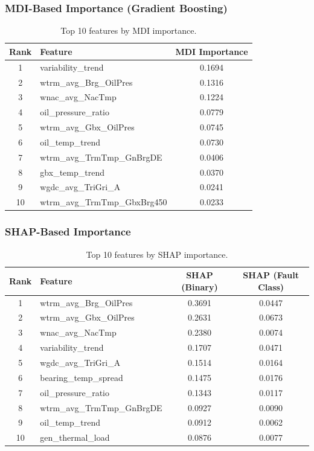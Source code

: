 \documentclass[preprint,12pt]{elsarticle}
\begin{document}
\subsubsection{MDI-Based Importance (Gradient Boosting)}

\begin{table}[H]
\centering
\caption{Top 10 features by MDI importance.}
\label{tab:mdi_importance}
\begin{tabular}{clc}
\toprule
Rank & Feature & MDI Importance \\
\midrule
1 & variability\_trend & 0.1694 \\
2 & wtrm\_avg\_Brg\_OilPres & 0.1316 \\
3 & wnac\_avg\_NacTmp & 0.1224 \\
4 & oil\_pressure\_ratio & 0.0779 \\
5 & wtrm\_avg\_Gbx\_OilPres & 0.0745 \\
6 & oil\_temp\_trend & 0.0730 \\
7 & wtrm\_avg\_TrmTmp\_GnBrgDE & 0.0406 \\
8 & gbx\_temp\_trend & 0.0370 \\
9 & wgdc\_avg\_TriGri\_A & 0.0241 \\
10 & wtrm\_avg\_TrmTmp\_GbxBrg450 & 0.0233 \\
\bottomrule
\end{tabular}
\end{table}

\subsubsection{SHAP-Based Importance}

\begin{table}[H]
\centering
\caption{Top 10 features by SHAP importance.}
\label{tab:shap_importance}
\begin{tabular}{clcc}
\toprule
Rank & Feature & SHAP (Binary) & SHAP (Fault Class) \\
\midrule
1 & wtrm\_avg\_Brg\_OilPres & 0.3691 & 0.0447 \\
2 & wtrm\_avg\_Gbx\_OilPres & 0.2631 & 0.0673 \\
3 & wnac\_avg\_NacTmp & 0.2380 & 0.0074 \\
4 & variability\_trend & 0.1707 & 0.0471 \\
5 & wgdc\_avg\_TriGri\_A & 0.1514 & 0.0164 \\
6 & bearing\_temp\_spread & 0.1475 & 0.0176 \\
7 & oil\_pressure\_ratio & 0.1343 & 0.0117 \\
8 & wtrm\_avg\_TrmTmp\_GnBrgDE & 0.0927 & 0.0090 \\
9 & oil\_temp\_trend & 0.0912 & 0.0062 \\
10 & gen\_thermal\_load & 0.0876 & 0.0077 \\
\bottomrule
\end{tabular}
\end{table}
\end{document}
